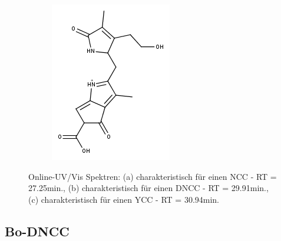 \begin{figure}[!htbp]
\begin{subfigure}[b]{0.5\textwidth}
    \includegraphics[width=\textwidth]{figures/Kapitel7/Kataboliten/fragmentation_structures/VWA_Katabolit_617-RingD-RingC_331.png}
    \caption{}
    \label{fig:DNCC2991}
  \end{subfigure}
  \caption[Online-UV/Vis Spektren mit der Charakteristik eines NCC bei 27.10min., eines DNCC bei 29.75min. sowie eines YCC bei 30.94min., Quelle: Autor]{Online-UV/Vis Spektren: (a) charakteristisch für einen \gls{NCC} - RT = 27.25min., (b) charakteristisch für einen \gls{DNCC} - RT = 29.91min., (c) charakteristisch für einen \gls{YCC} - RT = 30.94min.}
\end{figure}

\subsection{Bo-DNCC}


